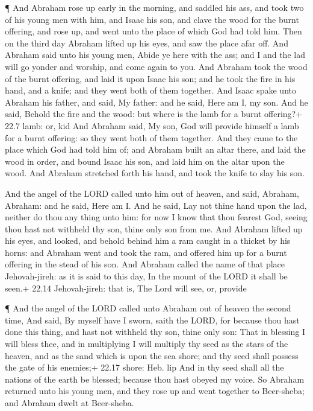  ¶ And Abraham rose up early in the morning, and saddled his
ass, and took two of his young men with him, and Isaac his son, and
clave the wood for the burnt offering, and rose up, and went unto the
place of which God had told him.  Then on the third day
Abraham lifted up his eyes, and saw the place afar off.  And
Abraham said unto his young men, Abide ye here with the ass; and I and
the lad will go yonder and worship, and come again to you. 
And Abraham took the wood of the burnt offering, and laid it upon Isaac
his son; and he took the fire in his hand, and a knife; and they went
both of them together.  And Isaac spake unto Abraham his
father, and said, My father: and he said, Here am I, my son. And he
said, Behold the fire and the wood: but where is the lamb for a burnt
offering?+ 22.7 lamb: or, kid  And Abraham said, My son, God
will provide himself a lamb for a burnt offering: so they went both of
them together.  And they came to the place which God had
told him of; and Abraham built an altar there, and laid the wood in
order, and bound Isaac his son, and laid him on the altar upon the wood.
 And Abraham stretched forth his hand, and took the knife
to slay his son.

 And the angel of the LORD called unto him out of heaven,
and said, Abraham, Abraham: and he said, Here am I.  And he
said, Lay not thine hand upon the lad, neither do thou any thing unto
him: for now I know that thou fearest God, seeing thou hast not withheld
thy son, thine only son from me.  And Abraham lifted up his
eyes, and looked, and behold behind him a ram caught in a thicket by his
horns: and Abraham went and took the ram, and offered him up for a burnt
offering in the stead of his son.  And Abraham called the
name of that place Jehovah-jireh: as it is said to this day, In the
mount of the LORD it shall be seen.+ 22.14 Jehovah-jireh: that is, The
Lord will see, or, provide

 ¶ And the angel of the LORD called unto Abraham out of
heaven the second time,  And said, By myself have I sworn,
saith the LORD, for because thou hast done this thing, and hast not
withheld thy son, thine only son:  That in blessing I will
bless thee, and in multiplying I will multiply thy seed as the stars of
the heaven, and as the sand which is upon the sea shore; and thy seed
shall possess the gate of his enemies;+ 22.17 shore: Heb. lip
 And in thy seed shall all the nations of the earth be
blessed; because thou hast obeyed my voice.  So Abraham
returned unto his young men, and they rose up and went together to
Beer-sheba; and Abraham dwelt at Beer-sheba.

